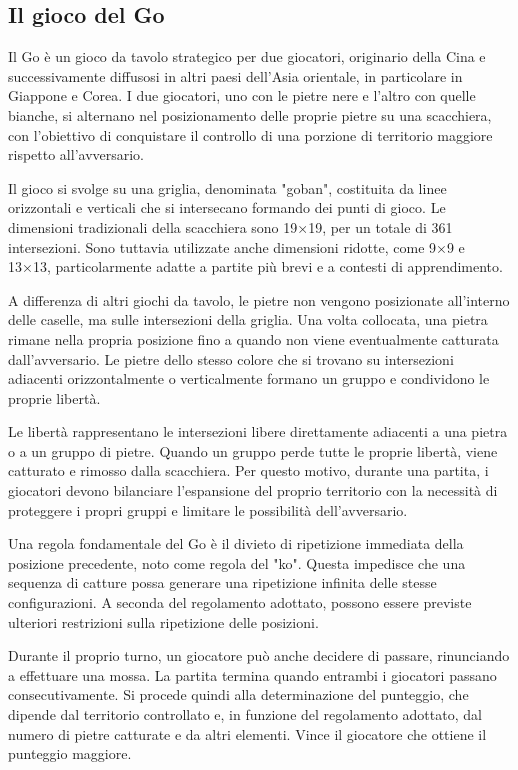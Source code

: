 \subsection{Il gioco del Go}

Il Go è un gioco da tavolo strategico per due giocatori, originario della Cina e successivamente diffusosi in altri paesi dell'Asia orientale, in particolare in Giappone e Corea. I due giocatori, uno con le pietre nere e l'altro con quelle bianche, si alternano nel posizionamento delle proprie pietre su una scacchiera, con l'obiettivo di conquistare il controllo di una porzione di territorio maggiore rispetto all'avversario.

Il gioco si svolge su una griglia, denominata "goban", costituita da linee orizzontali e verticali che si intersecano formando dei punti di gioco. Le dimensioni tradizionali della scacchiera sono 19×19, per un totale di 361 intersezioni. Sono tuttavia utilizzate anche dimensioni ridotte, come 9×9 e 13×13, particolarmente adatte a partite più brevi e a contesti di apprendimento.

A differenza di altri giochi da tavolo, le pietre non vengono posizionate all'interno delle caselle, ma sulle intersezioni della griglia. Una volta collocata, una pietra rimane nella propria posizione fino a quando non viene eventualmente catturata dall'avversario. Le pietre dello stesso colore che si trovano su intersezioni adiacenti orizzontalmente o verticalmente formano un gruppo e condividono le proprie libertà.

Le libertà rappresentano le intersezioni libere direttamente adiacenti a una pietra o a un gruppo di pietre. Quando un gruppo perde tutte le proprie libertà, viene catturato e rimosso dalla scacchiera. Per questo motivo, durante una partita, i giocatori devono bilanciare l'espansione del proprio territorio con la necessità di proteggere i propri gruppi e limitare le possibilità dell'avversario.

Una regola fondamentale del Go è il divieto di ripetizione immediata della posizione precedente, noto come regola del "ko". Questa impedisce che una sequenza di catture possa generare una ripetizione infinita delle stesse configurazioni. A seconda del regolamento adottato, possono essere previste ulteriori restrizioni sulla ripetizione delle posizioni.

Durante il proprio turno, un giocatore può anche decidere di passare, rinunciando a effettuare una mossa. La partita termina quando entrambi i giocatori passano consecutivamente. Si procede quindi alla determinazione del punteggio, che dipende dal territorio controllato e, in funzione del regolamento adottato, dal numero di pietre catturate e da altri elementi. Vince il giocatore che ottiene il punteggio maggiore.

